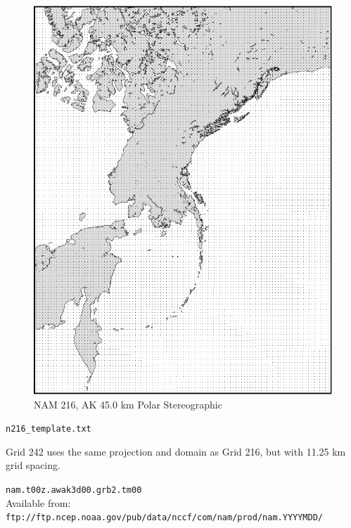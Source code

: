 \documentclass[11pt]{article}   %
\begin{document}
\begin{figure}[htbp]\begin{center}
 \includegraphics[angle=-90,scale=1.0]{Figs/n216.pdf}
\parbox{15cm}{\caption{\label{FigNAM2116}
NAM 216, AK 45.0 km Polar Stereographic
}}
\end{center}\end{figure}
\clearpage 
\verb|n216_template.txt| \\
\tiny  \normalsize


\clearpage
Grid 242 uses the same projection and domain as Grid 216, but with 11.25 km
grid spacing.

\verb|nam.t00z.awak3d00.grb2.tm00|\\
Available from:\\
\verb|ftp://ftp.ncep.noaa.gov/pub/data/nccf/com/nam/prod/nam.YYYYMDD/|
\end{document}
